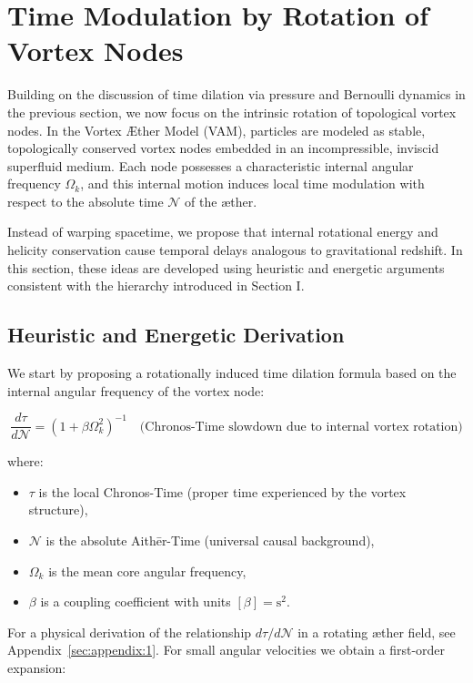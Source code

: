 \section{Time Modulation by Rotation of Vortex Nodes}

Building on the discussion of time dilation via pressure and Bernoulli dynamics in the previous section, we now focus on the intrinsic rotation of topological vortex nodes. In the Vortex Æther Model (VAM), particles are modeled as stable, topologically conserved vortex nodes embedded in an incompressible, inviscid superfluid medium. Each node possesses a characteristic internal angular frequency $\Omega_k$, and this internal motion induces local time modulation with respect to the absolute time $\mathcal{N}$ of the æther.

Instead of warping spacetime, we propose that internal rotational energy and helicity conservation cause temporal delays analogous to gravitational redshift. In this section, these ideas are developed using heuristic and energetic arguments consistent with the hierarchy introduced in Section I.

\subsection{Heuristic and Energetic Derivation}

We start by proposing a rotationally induced time dilation formula based on the internal angular frequency of the vortex node:

\begin{equation}
    \frac{d\tau}{d\mathcal{N}} = \left(1 + \beta \Omega_k^2 \right)^{-1}
    \quad \text{(Chronos-Time slowdown due to internal vortex rotation)}
    \label{eq:chronos_swirl_slowdown}
\end{equation}

where:

\begin{itemize}
    \item $\tau$ is the local Chronos-Time (proper time experienced by the vortex structure),
    \item $\mathcal{N}$ is the absolute Aithēr-Time (universal causal background),
    \item $\Omega_k$ is the mean core angular frequency,
    \item $\beta$ is a coupling coefficient with units $[\beta] = \mathrm{s}^2$.
\end{itemize}
For a physical derivation of the relationship \( d\tau/d\mathcal{N} \) in a rotating æther field, see Appendix~\ref{sec:appendix:1}.
For small angular velocities we obtain a first-order expansion:

